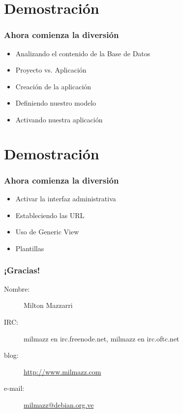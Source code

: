 \documentclass{beamer}
\begin{document}
\section{Demostración}
\begin{frame}
  \frametitle{Ahora comienza la diversión}
  \begin{itemize}[<+->]
    \item
      Analizando el contenido de la Base de Datos
    \item
      Proyecto vs. Aplicación
    \item
      Creación de la aplicación
    \item
      Definiendo nuestro modelo
    \item
      Activando nuestra aplicación
  \end{itemize}
\end{frame}

\section{Demostración}
\begin{frame}
  \frametitle{Ahora comienza la diversión}
  \begin{itemize}[<+->]
    \item
      Activar la interfaz administrativa
    \item
      Estableciendo las URL
    \item
      Uso de \alert{Generic View}
    \item
      Plantillas
  \end{itemize}
\end{frame}

\begin{frame}
  \frametitle{¡Gracias!}
  \begin{description}
    \item
      [Nombre:] Milton Mazzarri
    \item
      [IRC:] \alert{milmazz} en \alert{irc.freenode.net}, \alert{milmazz}
      en \alert{irc.oftc.net}
    \item 
      [blog:] \url{http://www.milmazz.com}
    \item
      [e-mail:]
      \href{mailto:milmazz@debian.org.ve}{milmazz@debian.org.ve}
  \end{description}
\end{frame}


\end{document}
